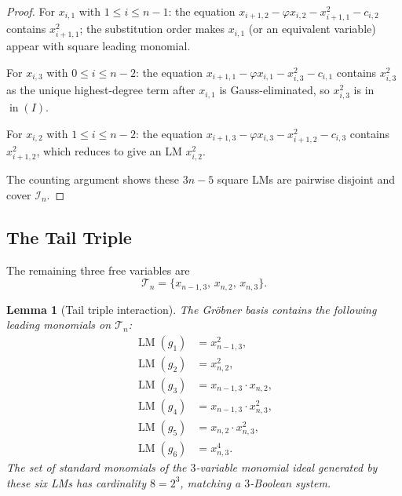 \documentclass[a4paper,11pt]{article}
\newtheorem{lemma}{Lemma}
\newcommand{\LM}{\operatorname{LM}}
\newcommand{\inI}{\operatorname{in}(I)}
\begin{document}
\begin{proof}
For $x_{i,1}$ with $1 \le i \le n-1$: the equation
$x_{i+1,2} - \varphi x_{i,2} - x_{i+1,1}^2 - c_{i,2}$ contains
$x_{i+1,1}^2$; the substitution order makes $x_{i,1}$ (or an equivalent
variable) appear with square leading monomial.

For $x_{i,3}$ with $0 \le i \le n-2$: the equation
$x_{i+1,1} - \varphi x_{i,1} - x_{i,3}^2 - c_{i,1}$ contains
$x_{i,3}^2$ as the unique highest-degree term after $x_{i,1}$ is
Gauss-eliminated, so $x_{i,3}^2$ is in $\inI$.

For $x_{i,2}$ with $1 \le i \le n-2$: the equation
$x_{i+1,3} - \varphi x_{i,3} - x_{i+1,2}^2 - c_{i,3}$ contains
$x_{i+1,2}^2$, which reduces to give an LM $x_{i,2}^2$.

The counting argument shows these $3n-5$ square LMs are pairwise
disjoint and cover $\mathcal{I}_n$.
\end{proof}

\subsection{The Tail Triple}

The remaining three free variables are
\[
\mathcal{T}_n = \{x_{n-1,3},\, x_{n,2},\, x_{n,3}\}.
\]

\begin{lemma}[Tail triple interaction]\label{lem:tail_t3}
The Gr\"obner basis contains the following leading monomials on
$\mathcal{T}_n$:
\begin{align*}
\LM(g_1) &= x_{n-1,3}^2,\\
\LM(g_2) &= x_{n,2}^2,\\
\LM(g_3) &= x_{n-1,3} \cdot x_{n,2},\\
\LM(g_4) &= x_{n-1,3} \cdot x_{n,3}^2,\\
\LM(g_5) &= x_{n,2} \cdot x_{n,3}^2,\\
\LM(g_6) &= x_{n,3}^4.
\end{align*}
The set of standard monomials of the $3$-variable monomial ideal
generated by these six LMs has cardinality $8 = 2^3$, matching a
$3$-Boolean system.
\end{lemma}
\end{document}
